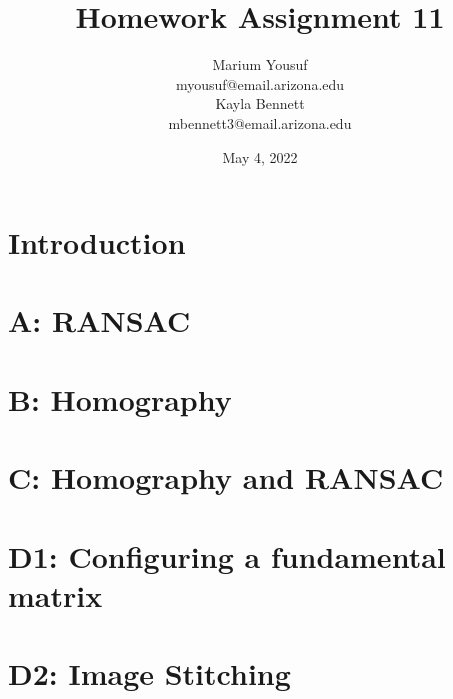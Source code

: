\documentclass{article}[12pt]
\begin{document}
\title{Homework Assignment 11}
\date{May 4, 2022}

\author{
  Marium Yousuf\\
  myousuf@email.arizona.edu\\
  Kayla Bennett \\
  mbennett3@email.arizona.edu
}

\maketitle
\noindent

\section{Introduction}


\section{A: RANSAC}

\clearpage
\section{B: Homography}

\clearpage
\section{C: Homography and RANSAC}

\clearpage
\section{D1: Configuring a fundamental matrix}

\clearpage
\section{D2: Image Stitching}

\end{document}
